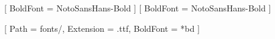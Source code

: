 \usepackage[boldfont]{xeCJK}

[ %
BoldFont = NotoSansHans-Bold %
]
[
  BoldFont = NotoSansHans-Bold
]

[ %
  Path = fonts/,
  Extension = .ttf,
  BoldFont = {*bd}
]

